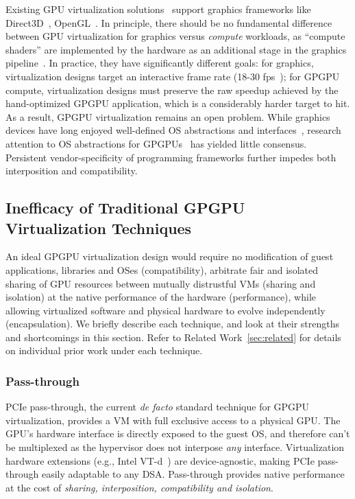 Existing GPU virtualization solutions~\cite{dowty2009gpu, VGML} support
graphics frameworks like Direct3D~\cite{directX}, OpenGL~\cite{openGLspec}.
In principle, there should be no fundamental difference between GPU
virtualization for graphics versus \emph{compute} workloads, as ``compute
shaders'' are implemented by the hardware as an additional stage in the
graphics pipeline~\cite{gpu_shader}.
In practice, they have significantly different goals:
for graphics, virtualization designs target an interactive frame rate (18-30
fps~\cite{frame_rate}); for GPGPU compute, virtualization designs must
preserve the raw speedup achieved by the hand-optimized GPGPU application,
which is a considerably harder target to hit. As a result, GPGPU virtualization
remains an open problem. While graphics devices have long enjoyed well-defined
OS abstractions and interfaces~\cite{winGDI}, research attention to OS
abstractions for GPGPUs~\cite{rossbach2011ptask, dandelion,
silberstein2013gpufs, timegraph, gdev, gpunet} has yielded little consensus.
Persistent vendor-specificity of programming frameworks further impedes both
interposition and compatibility.

\subsection{Inefficacy of Traditional GPGPU Virtualization Techniques}
An ideal GPGPU virtualization design would require no modification of
guest applications, libraries and OSes (compatibility), arbitrate fair and
isolated sharing of GPU resources between mutually distrustful VMs (sharing
and isolation) at the native performance of the hardware (performance), while
allowing virtualized software and physical hardware to evolve independently
(encapsulation).
We briefly describe each technique, and look at their strengths and
shortcomings in this section. Refer to Related Work~\ref{sec:related} for
details on individual prior work under each technique.

\subsubsection{Pass-through}
PCIe pass-through, the current \emph{de facto} standard technique for GPGPU
virtualization, provides a VM with full exclusive access to a physical GPU.
The GPU's hardware interface is directly exposed to the guest OS, and
therefore can't be multiplexed as the hypervisor does not interpose \emph{any}
interface. Virtualization hardware extensions (e.g., Intel VT-d~\cite{
abramson2006intel}) are device-agnostic, making PCIe pass-through easily
adaptable to any DSA. Pass-through provides native performance at the cost of
\emph{sharing, interposition, compatibility and isolation}.

